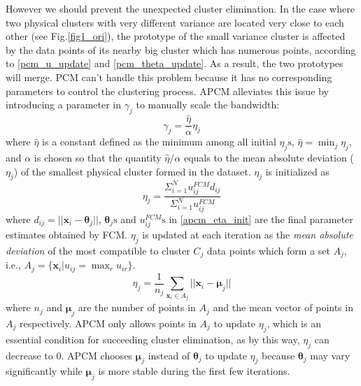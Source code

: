 \documentclass[journal,transmag]{IEEEtran}
\theoremstyle{definition}
\begin{document}
However we should prevent the unexpected cluster elimination. In the case where two physical clusters with very different variance are located very close to each other (see Fig.\ref{fig1_ori}), the prototype of the small variance cluster is affected by the data points of its nearby big cluster which has numerous points, according to \eqref{pcm_u_update} and \eqref{pcm_theta_update}. As a result, the two prototypes will merge. PCM can't handle this problem because it has no corresponding parameters to control the clustering process. APCM alleviates this issue by introducing a parameter in $\gamma_j$ to manually scale the bandwidth:
\begin{equation}
\label{corrected_eta}
\gamma_j=\frac{\hat{\eta}}{\alpha}\eta_j
\end{equation}
where $\hat{\eta}$ is a constant defined as the minimum among all initial $\eta_j\text{s}$, $\hat{\eta}=\min_j\eta_j$, and $\alpha$ is chosen so that the quantity $\hat{\eta}/\alpha$ equals to the mean absolute deviation ($\eta_j$)  of the smallest physical cluster formed in the dataset. $\eta_j$ is initialized as
\begin{equation}
\label{apcm_eta_init}
\eta_j=\frac{\Sigma_{i=1}^Nu_{ij}^{FCM}d_{ij}}{\Sigma_{i=1}^Nu_{ij}^{FCM}}
\end{equation}
where $d_{ij}=||\mathbf{x}_i-\boldsymbol{\theta}_j||$, $\boldsymbol{\theta}_j\text{s}$ and $u_{ij}^{FCM}\text{s}$ in \eqref{apcm_eta_init} are the final parameter estimates obtained by FCM. $\eta_j$ is updated at each iteration as the \emph{mean absolute deviation} of the most compatible to cluster $C_j$ data points which form a set $A_j$, i.e., $A_j=\{\mathbf{x}_i|u_{ij}=\max_r u_{ir}\}$.
\begin{equation}
\label{apcm_eta_update}
\eta_j=\frac{1}{n_j}\sum_{\mathbf{x}_i\in A_j}||\mathbf{x}_i-\boldsymbol{\mu}_j||
\end{equation}
where $n_j$ and $\boldsymbol{\mu}_j$ are the number of points in $A_j$ and the mean vector of points in $A_j$ respectively. APCM only allows points in $A_j$ to update $\eta_j$, which is an essential condition for succeeding cluster elimination, as by this way, $\eta_j$ can decrease to $0$. APCM chooses $\boldsymbol{\mu}_j$ instead of $\boldsymbol{\theta}_j$ to update $\eta_j$ because $\boldsymbol{\theta}_j$ may vary significantly while $\boldsymbol{\mu}_j$ is more stable during the first few iterations.
\end{document}
